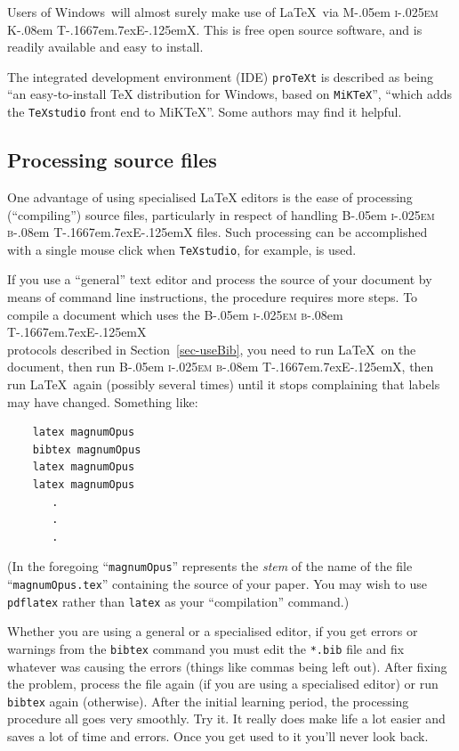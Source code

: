 \documentclass[
  times,
  doublespace]{anzsauth}
\newcommand\BibTeX{{\rmfamily B\kern-.05em \textsc{i\kern-.025em b}\kern-.08em
T\kern-.1667em\lower.7ex\hbox{E}\kern-.125emX}}
\newcommand\MiKTeX{{\rmfamily M\kern-.05em \textsc{i\kern-.025em K}\kern-.08em
T\kern-.1667em\lower.7ex\hbox{E}\kern-.125emX}}
\begin{document}
Users of Windows\texttrademark~will almost surely make use of \LaTeX~via
\MiKTeX. This is free open source software, and is readily available and
easy to install.

The integrated development environment (IDE) \texttt{proTeXt} is
described as being ``an easy-to-install \TeX{} distribution for
Windows\texttrademark, based on \texttt{MiKTeX}'', ``which adds the
\texttt{TeXstudio} front end to MiKTeX''. Some authors may find it
helpful.

\subsection{Processing source files}\label{sec-procBib}

One advantage of using specialised \LaTeX{} editors is the ease of
processing (``compiling'') source files, particularly in respect of
handling \BibTeX{} files. Such processing can be accomplished with a
single mouse click when \texttt{TeXstudio}, for example, is used.

If you use a ``general'' text editor and process the source of your
document by means of command line instructions, the procedure requires
more steps. To compile a document which uses the \BibTeX\\
protocols described in Section~\ref{sec-useBib}, you need to run
\LaTeX~on the document, then run \BibTeX, then run \LaTeX~again
(possibly several times) until it stops complaining that labels may have
changed. Something like:

\begin{verbatim}
    latex magnumOpus
    bibtex magnumOpus
    latex magnumOpus
    latex magnumOpus
       .
       .
       .
\end{verbatim}

(In the foregoing ``\texttt{magnumOpus}'' represents the \emph{stem} of
the name of the file ``\texttt{magnumOpus.tex}'' containing the source
of your paper. You may wish to use \texttt{pdflatex} rather than
\texttt{latex} as your ``compilation'' command.)

Whether you are using a general or a specialised editor, if you get
errors or warnings from the \texttt{bibtex} command you must edit the
\texttt{*.bib} file and fix whatever was causing the errors (things like
commas being left out). After fixing the problem, process the file again
(if you are using a specialised editor) or run \texttt{bibtex} again
(otherwise). After the initial learning period, the processing procedure
all goes very smoothly. Try it. It really does make life a lot easier
and saves a lot of time and errors. Once you get used to it you'll never
look back.
\end{document}
